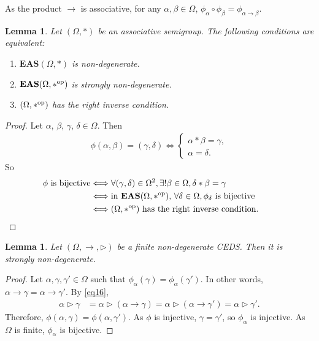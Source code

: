 \documentclass[10pt,a4paper]{amsart}
\numberwithin{equation}{section}
\newtheorem{Lemma}[Theorem]{Lemma}
\newcommand{\eas}{\mathbf{EAS}}
\begin{document}
\begin{Remark}
As the product $\rightarrow$ is associative, for any $\alpha,\beta \in \Omega$,
$\phi_\alpha \circ \phi_\beta=\phi_{\alpha \rightarrow \beta}$.
\end{Remark}

\begin{Lemma} \label{lem3.3}
Let $(\Omega,*)$ be an associative semigroup. The following conditions are equivalent:
\begin{enumerate}\itemsep=0pt
\item[$(1)$] $\eas(\Omega,*)$ is non-degenerate.
\item[$(2)$] $\eas(\Omega,*^{\rm op})$ is strongly non-degenerate.
\item[$(3)$] $(\Omega,*^{\rm op})$ has the right inverse condition.
\end{enumerate}
\end{Lemma}

\begin{proof}
Let $\alpha$, $\beta$, $\gamma$, $\delta\in \Omega$. Then
\begin{align*}
\phi(\alpha,\beta)=(\gamma,\delta) \Longleftrightarrow \begin{cases}
\alpha*\beta=\gamma,\\
\alpha=\delta.
\end{cases}\end{align*}
So
\begin{align*}
\phi\text{ is bijective}&\Longleftrightarrow\forall (\gamma,\delta)\in \Omega^2,
\exists! \beta \in \Omega, \delta*\beta=\gamma\\
&\Longleftrightarrow \text{in $\eas(\Omega,*^{\rm op})$, }\forall \delta \in \Omega, \phi_{\delta}\text{ is bijective}\\
&\Longleftrightarrow\text{$(\Omega,*^{\rm op})$ has the right inverse condition}. \tag*{\qed}
\end{align*} \renewcommand{\qed}{}\end{proof}


\begin{Lemma}\label{lem3.4}
Let $(\Omega,\rightarrow,\triangleright)$ be a finite non-degenerate CEDS. Then it is strongly non-degenerate.
\end{Lemma}

\begin{proof}
Let $\alpha,\gamma,\gamma' \in \Omega$ such that $\phi_\alpha(\gamma)=\phi_\alpha(\gamma')$. In other words, $\alpha \rightarrow \gamma=\alpha\rightarrow \gamma'$. By \eqref{eq16},
\begin{align*}
\alpha \triangleright\gamma&=\alpha \triangleright (\alpha \rightarrow \gamma)=\alpha \triangleright (\alpha \rightarrow \gamma')=\alpha \triangleright \gamma'.
\end{align*}
Therefore, $\phi(\alpha,\gamma)=\phi(\alpha,\gamma')$. As $\phi$ is injective, $\gamma=\gamma'$, so $\phi_\alpha$ is injective. As $\Omega$ is finite, $\phi_\alpha$ is bijective.
\end{proof}
\end{document}
